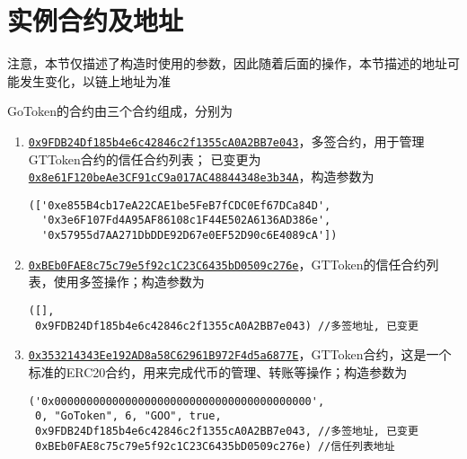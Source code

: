 \documentclass[12pt]{article}
\newcommand{\ethaddr}[1]{{\href{https://etherscan.io/address/#1}{\texttt{#1}}}}
\begin{document}
\section{实例合约及地址}
{\color{red} 注意，本节仅描述了构造时使用的参数，因此随着后面的操作，本节描述的地址可能发生变化，以链上地址为准}

GoToken的合约由三个合约组成，分别为
\begin{enumerate}
\item \ethaddr{0x9FDB24Df185b4e6c42846c2f1355cA0A2BB7e043}，多签合约，用于管理GTToken合约的信任合约列表；{\color{red} 已变更为\ethaddr{0x8e61F120beAe3CF91cC9a017AC48844348e3b34A}}，构造参数为
\begin{verbatim}
(['0xe855B4cb17eA22CAE1be5FeB7fCDC0Ef67DCa84D',
  '0x3e6F107Fd4A95AF86108c1F44E502A6136AD386e',
  '0x57955d7AA271DbDDE92D67e0EF52D90c6E4089cA'])
\end{verbatim}
\item \ethaddr{0xBEb0FAE8c75c79e5f92c1C23C6435bD0509c276e}，GTToken的信任合约列表，使用多签操作；构造参数为
\begin{verbatim}
([], 
 0x9FDB24Df185b4e6c42846c2f1355cA0A2BB7e043) //多签地址, 已变更
\end{verbatim}
\item \ethaddr{0x353214343Ee192AD8a58C62961B972F4d5a6877E}，GTToken合约，这是一个标准的ERC20合约，用来完成代币的管理、转账等操作；构造参数为
\begin{verbatim}
('0x0000000000000000000000000000000000000000', 
 0, "GoToken", 6, "GOO", true, 
 0x9FDB24Df185b4e6c42846c2f1355cA0A2BB7e043, //多签地址, 已变更
 0xBEb0FAE8c75c79e5f92c1C23C6435bD0509c276e) //信任列表地址
\end{verbatim}
\end{enumerate}
\end{document}
